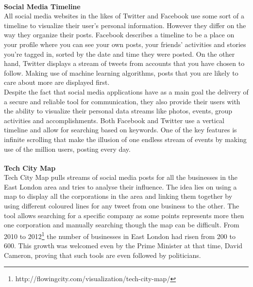 \documentclass{l4proj}
\begin{document}
\paragraph{}
\textbf{Social Media Timeline} \\
All social media websites in the likes of Twitter and Facebook use some sort of a timeline to visualize their user's personal information. However they differ on the way they organize their posts. Facebook describes a timeline to be a place on your profile where you can see your own posts, your friends' activities and stories you're tagged in, sorted by the date and time they were posted. On the other hand, Twitter displays a stream of tweets from accounts that you have chosen to follow. Making use of machine learning algorithms, posts that you are likely to care about more are displayed first.
\\
Despite the fact that social media applications have as a main goal the delivery of a secure and reliable tool for communication, they also provide their users with the ability to visualize their personal data streams like photos, events, group activities and accomplishments. Both Facebook and Twitter use a vertical timeline and allow for searching based on keywords. One of the key features is infinite scrolling that make the illusion of one endless stream of events by making use of the million users, posting every day. 
\paragraph{}
\textbf{Tech City Map} \\
Tech City Map pulls streams of social media posts for all the businesses in the East London area and tries to analyse their influence. The idea lies on using a map to display all the corporations in the area and linking them together by using different coloured lines for any tweet from one business to the other. The tool allows searching for a specific company as some points represents more then one corporation and manually searching though the map can be difficult. From 2010 to 2012\footnote{http://flowingcity.com/visualization/tech-city-map/} the number of businesses in East London had risen from 200 to 600. This growth was welcomed even by the Prime Minister at that time, David Cameron, proving that such tools are even followed by politicians. 
\end{document}
